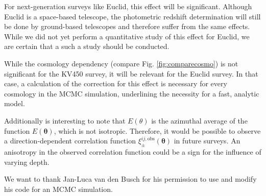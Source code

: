 \documentclass[referee]{aa} %
\renewcommand{\[}{\begin{equation}}
\renewcommand{\]}{\end{equation}}
\renewcommand{\rm}{\mathrm}
\def\b#1{\bm{#1}}
\begin{document}
For next-generation surveys like Euclid, this effect will be significant. Although Euclid is a space-based telescope, the photometric redshift determination will still be done by ground-based telescopes and therefore suffer from the same effects. While we did not yet perform a quantitative study of this effect for Euclid, we are certain that a such a study should be conducted.

While the cosmology dependency (compare Fig. \ref{fig:comparecosmo}) is not significant for the KV450 survey, it will be relevant for the Euclid survey. In that case, a calculation of the correction for this effect is necessary for every cosmology in the MCMC simulation, underlining the necessity for a fast, analytic model. 

Additionally is interesting to note that $E(\theta)$ is the azimuthal average of the function $E(\b\theta)$, which is not isotropic. Therefore, it would be possible to observe a direction-dependent correlation function $\xi_\pm^{ij,\rm{obs}}(\b\theta)$ in future surveys. An anisotropy in the observed correlation function could be a sign for the influence of varying depth.



\begin{acknowledgements}
We want to thank Jan-Luca van den Busch for his permission to use and modify his code for an MCMC simulation.\end{acknowledgements}
\end{document}
